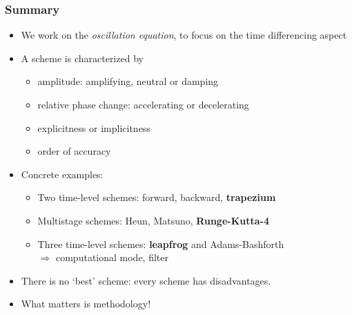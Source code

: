 \documentclass[aspectratio=43,9pt]{beamer}
\begin{document}
%
\begin{frame}
	\frametitle{Summary}
	\begin{itemize}
		\item We work on the \emph{oscillation equation}, to focus on the time differencing aspect\vspace*{3ex}
		\item A scheme is characterized by
			\begin{itemize}
				\item amplitude: amplifying, neutral or damping
				\item relative phase change: accelerating or decelerating
				\item explicitness or implicitness
				\item order of accuracy\vspace*{3ex}
			\end{itemize}
		\item Concrete examples:
			\begin{itemize}
				\item Two time-level schemes: forward, backward, \textbf{trapezium}
				\item Multistage schemes: Heun, Matsuno, \textbf{Runge-Kutta-4}
				\item Three time-level schemes: \textbf{leapfrog} and Adams-Bashforth\\
					{\hspace*{5mm}$\Rightarrow$ computational mode, filter}\vspace*{3ex}
			\end{itemize}
		\item There is no `best' scheme: every scheme has disadvantages.\vspace*{3ex}
		\item What matters is methodology!
	\end{itemize}
\end{frame}
%
%
\end{document}
